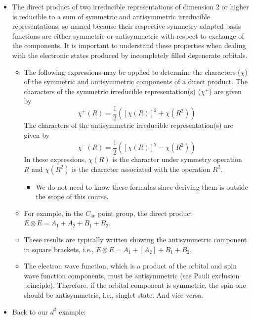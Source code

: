 \documentclass[../notes.tex]{subfiles}
\begin{document}
\begin{itemize}
\begin{itemize}
    \end{itemize}
    \item The direct product of two irreducible representations of dimension 2 or higher is reducible to a sum of symmetric and antisymmetric irreducible representations, so named because their respective symmetry-adapted basis functions are either symmetric or antisymmetric with respect to exchange of the components. It is important to understand these properties when dealing with the electronic states produced by incompletely filled degenerate orbitals.
    \begin{itemize}
        \item The following expressions may be applied to determine the characters ($\chi$) of the symmetric and antisymmetric components of a direct product. The characters of the symmetric irreducible representation(s) ($\chi^+$) are given by
        \begin{equation*}
            \chi^+(R) = \frac{1}{2}\left( [\chi(R)]^2+\chi(R^2) \right)
        \end{equation*}
        The characters of the antisymmetric irreducible representation(s) are given by
        \begin{equation*}
            \chi^-(R) = \frac{1}{2}\left( [\chi(R)]^2-\chi(R^2) \right)
        \end{equation*}
        In these expressions, $\chi(R)$ is the character under symmetry operation $R$ and $\chi(R^2)$ is the character associated with the operation $R^2$.
        \begin{itemize}
            \item We do not need to know these formulas since deriving them is outside the scope of this course.
        \end{itemize}
        \item For example, in the $C_{4v}$ point group, the direct product $E\otimes E=A_1+A_2+B_1+B_2$.
        \item These results are typically written showing the antisymmetric component in square brackets, i.e., $E\otimes E=A_1+[A_2]+B_1+B_2$.
        \item The electron wave function, which is a product of the orbital and spin wave function components, must be antisymmetric (see Pauli exclusion principle). Therefore, if the orbital component is symmetric, the spin one should be antisymmetric, i.e., singlet state. And vice versa.
    \end{itemize}
    \item Back to our $d^2$ example:

\end{itemize}
\end{document}
